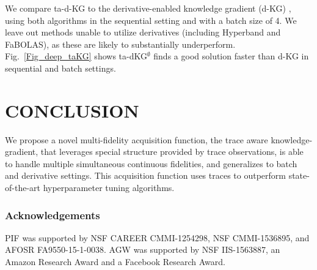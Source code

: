 \documentclass[letterpaper]{article}
\newcommand{\taKG}{\text{taKG}}
\newcommand{\taKGE}{\text{taKG}^\emptyset}
\numberwithin{equation}{section}
\begin{document}
We compare ta-d-KG to the derivative-enabled knowledge gradient (d-KG) \citep{wu2017bayesian}, using both algorithms in the sequential setting and with a batch size of 4.  We leave out methods unable to utilize derivatives (including Hyperband and FaBOLAS), as these are likely to substantially underperform.
Fig.~\ref{Fig_deep_taKG} shows ta-dKG$^\emptyset$ finds a good solution faster than d-KG in sequential and batch settings.




\section{CONCLUSION}
\label{sect:conclusion}
We propose a novel multi-fidelity acquisition function, the trace aware knowledge-gradient, that 
leverages special structure provided by trace observations,
is able to handle multiple simultaneous continuous fidelities, and 
generalizes to batch and derivative settings.
This acquisition function uses traces to outperform
state-of-the-art hyperparameter tuning algorithms.



\subsubsection*{Acknowledgements}
PIF was supported by NSF CAREER CMMI-1254298, NSF CMMI-1536895, and AFOSR FA9550-15-1-0038.
AGW was supported by NSF IIS-1563887, an Amazon Research Award and a Facebook Research Award.







\end{document}
